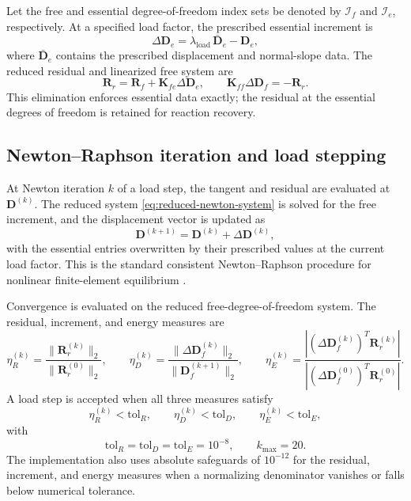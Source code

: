 \documentclass[preprint,12pt]{elsarticle}
\begin{document}
Let the free and essential degree-of-freedom index sets be denoted by
$\mathcal{I}_f$ and $\mathcal{I}_e$, respectively. At a specified load
factor, the prescribed essential increment is
\begin{equation}
 \Delta\mathbf{D}_e
 =\lambda_{\mathrm{load}}\,\bar{\mathbf{D}}_e-\mathbf{D}_e,
 \label{eq:essential-increment}
\end{equation}
where $\bar{\mathbf{D}}_e$ contains the prescribed displacement and
normal-slope data. The reduced residual and linearized free system are
\begin{equation}
 \mathbf{R}_r
 =\mathbf{R}_f+\mathbf{K}_{fe}\Delta\mathbf{D}_e,
 \qquad
 \mathbf{K}_{ff}\Delta\mathbf{D}_f=-\mathbf{R}_r.
 \label{eq:reduced-newton-system}
\end{equation}
This elimination enforces essential data exactly; the residual at the
essential degrees of freedom is retained for reaction recovery.

\subsection{Newton--Raphson iteration and load stepping}
\label{sec:newton-load-stepping}

At Newton iteration $k$ of a load step, the tangent and residual are
evaluated at $\mathbf{D}^{(k)}$. The reduced system
\eqref{eq:reduced-newton-system} is solved for the free increment, and
the displacement vector is updated as
\begin{equation}
 \mathbf{D}^{(k+1)}
 =\mathbf{D}^{(k)}+\Delta\mathbf{D}^{(k)},
 \label{eq:newton-update}
\end{equation}
with the essential entries overwritten by their prescribed values at the
current load factor. This is the standard consistent Newton--Raphson
procedure for nonlinear finite-element equilibrium
\cite{SimoHughes1998,Bathe2006,BelytschkoLiuMoran2000}.

Convergence is evaluated on the reduced free-degree-of-freedom system.
The residual, increment, and energy measures are
\begin{equation}
 \eta_R^{(k)}
 =\frac{\|\mathbf{R}_r^{(k)}\|_2}{\|\mathbf{R}_r^{(0)}\|_2},
 \qquad
 \eta_D^{(k)}
 =\frac{\|\Delta\mathbf{D}_f^{(k)}\|_2}
 {\|\mathbf{D}_f^{(k+1)}\|_2},
 \qquad
 \eta_E^{(k)}
 =\frac{\left|\left(\Delta\mathbf{D}_f^{(k)}\right)^T
 \mathbf{R}_r^{(k)}\right|}
 {\left|\left(\Delta\mathbf{D}_f^{(0)}\right)^T
 \mathbf{R}_r^{(0)}\right|}.
 \label{eq:newton-convergence-measures}
\end{equation}
A load step is accepted when all three measures satisfy
\begin{equation}
 \eta_R^{(k)}<\mathrm{tol}_R,
 \qquad
 \eta_D^{(k)}<\mathrm{tol}_D,
 \qquad
 \eta_E^{(k)}<\mathrm{tol}_E,
 \label{eq:newton-convergence-test}
\end{equation}
with
\begin{equation}
 \mathrm{tol}_R=\mathrm{tol}_D=\mathrm{tol}_E=10^{-8},
 \qquad
 k_{\max}=20.
 \label{eq:newton-controls}
\end{equation}
The implementation also uses absolute safeguards of $10^{-12}$ for the
residual, increment, and energy measures when a normalizing denominator
vanishes or falls below numerical tolerance.
\end{document}

